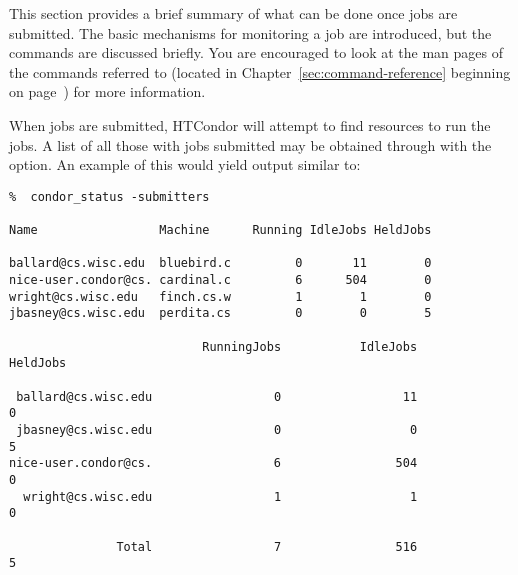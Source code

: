 This section provides a brief summary of what can be done once jobs
are submitted. The basic mechanisms for monitoring a job are
introduced, but the commands are discussed briefly.
You are encouraged to
look at the man pages of the commands referred to (located in
Chapter~\ref{sec:command-reference} beginning on
page~\pageref{sec:command-reference}) for more information. 

When jobs are submitted, HTCondor will attempt to find resources
to run the jobs. 
A list of all those with jobs submitted
may be obtained through 
with the 
 option. 
An example of this would yield output similar to:
\footnotesize
\begin{verbatim}
%  condor_status -submitters

Name                 Machine      Running IdleJobs HeldJobs

ballard@cs.wisc.edu  bluebird.c         0       11        0
nice-user.condor@cs. cardinal.c         6      504        0
wright@cs.wisc.edu   finch.cs.w         1        1        0
jbasney@cs.wisc.edu  perdita.cs         0        0        5

                           RunningJobs           IdleJobs           HeldJobs

 ballard@cs.wisc.edu                 0                 11                  0
 jbasney@cs.wisc.edu                 0                  0                  5
nice-user.condor@cs.                 6                504                  0
  wright@cs.wisc.edu                 1                  1                  0

               Total                 7                516                  5
\end{verbatim}
\normalsize

